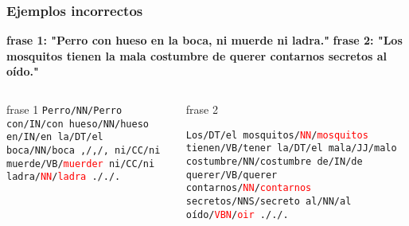 \documentclass{beamer}
\begin{document}
\begin{frame}
\frametitle{Ejemplos incorrectos}
\begin{scriptsize}
\textbf{frase 1: "Perro con hueso en la boca, ni muerde ni ladra."} \newline
\textbf{frase 2: "Los mosquitos tienen la mala costumbre de querer contarnos secretos al oído."}
\end{scriptsize}
\begin{columns}[c]
\begin{scriptsize}
\begin{block}{frase 1}
\texttt{Perro/NN/Perro\newline
con/IN/con\newline
hueso/NN/hueso\newline
en/IN/en\newline
la/DT/el\newline
boca/NN/boca\newline
,/,/,\newline
ni/CC/ni\newline
muerde/VB/\textcolor{red}{muerder}\newline
ni/CC/ni\newline
ladra/\textcolor{red}{NN}/\textcolor{red}{ladra}\newline
././.\newline
}
\end{block}
\end{scriptsize}
\begin{scriptsize}
\begin{block}{frase 2}

\texttt{Los/DT/el\newline
mosquitos/\textcolor{red}{NN}/\textcolor{red}{mosquitos}\newline
tienen/VB/tener\newline
la/DT/el\newline
mala/JJ/malo\newline
costumbre/NN/costumbre\newline
de/IN/de\newline
querer/VB/querer\newline
contarnos/\textcolor{red}{NN}/\textcolor{red}{contarnos}\newline
secretos/NNS/secreto\newline
al/NN/al\newline
oído/\textcolor{red}{VBN}/\textcolor{red}{oir}\newline
././.\newline
}
\end{block}
\end{scriptsize}
\end{columns}
\end{frame}
\end{document}
